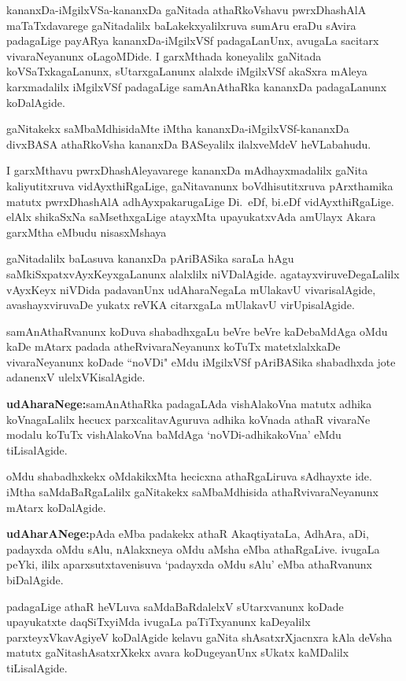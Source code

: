 

kananxDa-iMgilxVSa-kananxDa gaNitada athaRkoVshavu pwrxDhashAlA maTaTxdavarege gaNitadalilx baLakekxyalilxruva sumAru eraDu sAvira padagaLige payARya kananxDa-iMgilxVSf padagaLanUnx, avugaLa sacitarx vivaraNeyanunx oLagoMDide. I garxMthada koneyalilx gaNitada koVSaTxkagaLanunx, sUtarxgaLanunx alalxde iMgilxVSf akaSxra mAleya karxmadalilx iMgilxVSf padagaLige samAnAthaRka kananxDa padagaLanunx koDalAgide.

gaNitakekx saMbaMdhisidaMte iMtha kananxDa-iMgilxVSf-kananxDa divxBASA athaRkoVsha kananxDa BASeyalilx ilalxveMdeV heVLabahudu.

I garxMthavu pwrxDhashAleyavarege kananxDa mAdhayxmadalilx gaNita kaliyutitxruva vidAyxthiRgaLige, gaNitavanunx boVdhisutitxruva pArxthamika matutx pwrxDhashAlA adhAyxpakarugaLige Di.~eDf, bi.eDf vidAyxthiRgaLige. elAlx shikaSxNa saMsethxgaLige atayxMta upayukatxvAda amUlayx Akara garxMtha eMbudu nisasxMshaya

gaNitadalilx baLasuva kananxDa pAriBASika saraLa hAgu saMkiSxpatxvAyxKeyxgaLanunx alalxlilx niVDalAgide. agatayxviruveDegaLalilx vAyxKeyx niVDida padavanUnx udAharaNegaLa mUlakavU vivarisalAgide, avashayxviruvaDe yukatx reVKA citarxgaLa mUlakavU virUpisalAgide.

samAnAthaRvanunx koDuva shabadhxgaLu beVre beVre kaDebaMdAga oMdu kaDe mAtarx padada atheRvivaraNeyanunx koTuTx matetxlalxkaDe vivaraNeyanunx koDade ``noVDi" eMdu iMgilxVSf pAriBASika shabadhxda jote adanenxV ulelxVKisalAgide.

\textbf{udAharaNege:}\quad samAnAthaRka padagaLAda vishAlakoVna matutx adhika koVnagaLalilx hecucx parxcalitavAguruva adhika koVnada athaR vivaraNe modalu koTuTx vishAlakoVna baMdAga `noVDi-adhikakoVna' eMdu tiLisalAgide.

oMdu shabadhxkekx oMdakikxMta hecicxna athaRgaLiruva sAdhayxte ide. iMtha saMdaBaRgaLalilx gaNitakekx saMbaMdhisida athaRvivaraNeyanunx mAtarx koDalAgide.

\textbf{udAharANege:}\quad pAda eMba padakekx athaR AkaqtiyataLa, AdhAra, aDi, padayxda oMdu sAlu, nAlakxneya oMdu aMsha eMba athaRgaLive. ivugaLa peYki, ililx aparxsutxtavenisuva `padayxda oMdu sAlu' eMba athaRvanunx biDalAgide.

padagaLige athaR heVLuva saMdaBaRdalelxV sUtarxvanunx koDade upayukatxte daqSiTxyiMda ivugaLa paTiTxyanunx kaDeyalilx parxteyxVkavAgiyeV koDalAgide kelavu gaNita shAsatxrXjacnxra kAla deVsha matutx gaNitashAsatxrXkekx avara koDugeyanUnx sUkatx kaMDalilx tiLisalAgide.

